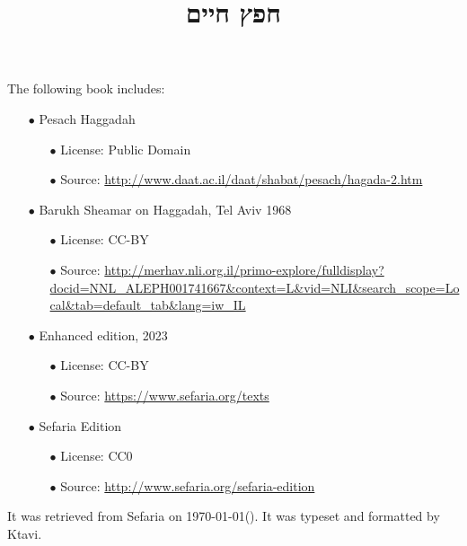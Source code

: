 \documentclass[12pt, openany]{book}
\newcommand{\texttitle}{חפץ חיים}\usepackage{titlesec}
\begin{document}
\frontmatter
{}

\newcommand{\oneline}[1]{%
	\newdimen{\namewidth}%
	\setlength{\namewidth}{\widthof{#1}}%
	\ifthenelse{\lengthtest{\namewidth < \textwidth}}%
	{#1}%
	{\resizebox{\textwidth}{!}{#1}}%
}

\title{\oneline{\hspace*{0.5in}\texttitle\hspace*{0.5in}}}

\author{}

\date{}

\maketitle

\begin{minipage}[b][\textheight][b]{\textwidth}\englishfont\footnotesize
	\begin{english}
		\vfill
		The following book includes:
\begin{itemize}
\item[$\bullet$] Pesach Haggadah
\begin{itemize}
\item[$\bullet$] License: Public Domain
\item[$\bullet$] Source: \url{http://www.daat.ac.il/daat/shabat/pesach/hagada-2.htm}
\end{itemize}
\item[$\bullet$] Barukh Sheamar on Haggadah, Tel Aviv 1968
\begin{itemize}
\item[$\bullet$] License: CC-BY
\item[$\bullet$] Source: \url{http://merhav.nli.org.il/primo-explore/fulldisplay?docid=NNL_ALEPH001741667&context=L&vid=NLI&search_scope=Local&tab=default_tab&lang=iw_IL}
\end{itemize}
\item[$\bullet$] Enhanced edition, 2023
\begin{itemize}
\item[$\bullet$] License: CC-BY
\item[$\bullet$] Source: \url{https://www.sefaria.org/texts}
\end{itemize}
\item[$\bullet$] Sefaria Edition
\begin{itemize}
\item[$\bullet$] License: CC0
\item[$\bullet$] Source: \url{http://www.sefaria.org/sefaria-edition}
\end{itemize}
\end{itemize}
		It was retrieved from Sefaria on \today\space \texthebrew{(\Hebrewtoday)}.  It was typeset and formatted by Ktavi.
		\clearpage
		
	\end{english}
\end{minipage}
\end{document}

